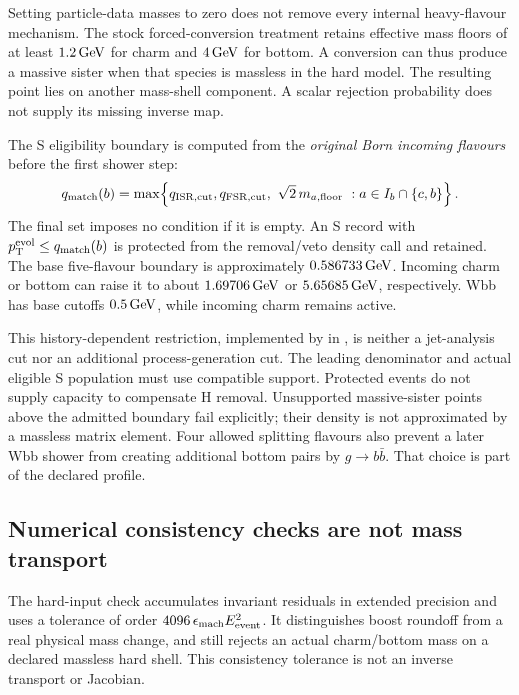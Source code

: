 Setting particle-data masses to zero does not remove every internal
heavy-flavour mechanism.
The stock forced-conversion treatment retains effective mass floors
of at least $1.2\,\mathrm{GeV}$ for charm and $4\,\mathrm{GeV}$ for bottom.
A conversion can thus produce a massive sister when that species
is massless in the hard model.
The resulting point lies on another mass-shell component.
A scalar rejection probability does not supply its missing inverse map.

The S eligibility boundary is computed from the \emph{original Born
incoming flavours} before the first shower step:
\begin{equation}
 q_{\rm match}(b)=
 \max\!\left\{
 q_{\rm ISR,cut},q_{\rm FSR,cut},
 \ \sqrt{2}\,m_{a,\rm floor}\ :
 a\in I_b\cap\{c,b\}\right\}.
 \label{eq:masses-protected-boundary}
\end{equation}
The final set imposes no condition if it is empty.
An S record with $p_{\mathrm T}^{\rm evol}\le q_{\rm match}(b)$ is protected
from the removal/veto density call and retained.
The base five-flavour boundary is approximately $0.586733\,\mathrm{GeV}$.
Incoming charm or bottom can raise it to about $1.69706\,\mathrm{GeV}$
or $5.65685\,\mathrm{GeV}$, respectively.
Wbb has base cutoffs $0.5\,\mathrm{GeV}$, while incoming charm remains active.

This history-dependent restriction, implemented by
 in ,
is neither a jet-analysis cut nor an additional process-generation cut.
The leading denominator and actual eligible S population must use
compatible support. Protected events do not supply capacity to
compensate H removal.
Unsupported massive-sister points above the admitted boundary fail
explicitly; their density is not approximated by a massless
matrix element.
Four allowed splitting flavours also prevent a later Wbb shower
from creating additional bottom pairs by $g\to b\bar b$.
That choice is part of the declared profile.

\subsection{Numerical consistency checks are not mass transport}
\label{sec:masses-numerics}

The hard-input check accumulates invariant residuals in extended
precision and uses a tolerance of order
$4096\,\epsilon_{\rm mach}E_{\rm event}^2$.
It distinguishes boost roundoff from a real physical mass change,
and still rejects an actual charm/bottom mass on a declared
massless hard shell.
This consistency tolerance is not an inverse transport or Jacobian.

